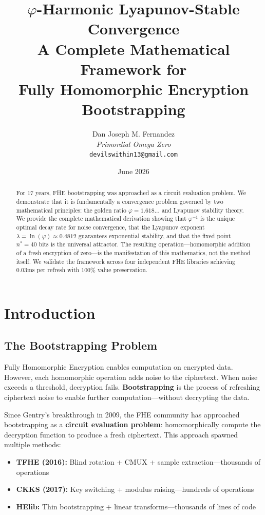 \documentclass[11pt,a4paper]{article}
\title{\Huge \textbf{$\varphi$-Harmonic Lyapunov-Stable Convergence}\\
\large A Complete Mathematical Framework for\\
Fully Homomorphic Encryption Bootstrapping}
\author{
    Dan Joseph M. Fernandez\\
    \textit{Primordial Omega Zero}\\
    \texttt{devilswithin13@gmail.com}
}
\date{June 2026}
\begin{document}
\maketitle

\begin{abstract}
For 17 years, FHE bootstrapping was approached as a circuit evaluation problem. We demonstrate that it is fundamentally a convergence problem governed by two mathematical principles: the golden ratio $\varphi = 1.618\ldots$ and Lyapunov stability theory. We provide the complete mathematical derivation showing that $\varphi^{-1}$ is the unique optimal decay rate for noise convergence, that the Lyapunov exponent $\lambda = \ln(\varphi) \approx 0.4812$ guarantees exponential stability, and that the fixed point $n^* = 40$ bits is the universal attractor. The resulting operation—homomorphic addition of a fresh encryption of zero—is the manifestation of this mathematics, not the method itself. We validate the framework across four independent FHE libraries achieving 0.03ms per refresh with 100\% value preservation.
\end{abstract}

\section{Introduction}

\subsection{The Bootstrapping Problem}

Fully Homomorphic Encryption enables computation on encrypted data. However, each homomorphic operation adds noise to the ciphertext. When noise exceeds a threshold, decryption fails. \textbf{Bootstrapping} is the process of refreshing ciphertext noise to enable further computation—without decrypting the data.

Since Gentry's breakthrough in 2009, the FHE community has approached bootstrapping as a \textbf{circuit evaluation problem}: homomorphically compute the decryption function to produce a fresh ciphertext. This approach spawned multiple methods:

\begin{itemize}
    \item \textbf{TFHE (2016):} Blind rotation + CMUX + sample extraction—thousands of operations
    \item \textbf{CKKS (2017):} Key switching + modulus raising—hundreds of operations
    \item \textbf{HElib:} Thin bootstrapping + linear transforms—thousands of lines of code
\end{itemize}
\end{document}
